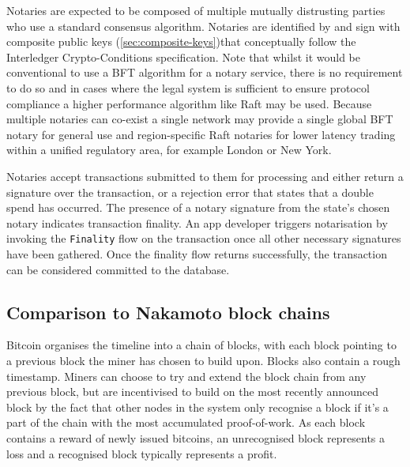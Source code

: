 \documentclass{article}
\begin{document}
Notaries are expected to be composed of multiple mutually distrusting parties who use a standard consensus algorithm.
Notaries are identified by and sign with composite public keys (\cref{sec:composite-keys})that conceptually follow the
Interledger Crypto-Conditions specification\cite{ILPCC}. Note that whilst it would be conventional to use a BFT
algorithm for a notary service, there is no requirement to do so and in cases where the legal system is sufficient to
ensure protocol compliance a higher performance algorithm like Raft\cite{Ongaro:2014:SUC:2643634.2643666} may be used.
Because multiple notaries can co-exist a single network may provide a single global BFT notary for general use and
region-specific Raft notaries for lower latency trading within a unified regulatory area, for example London or New York.

Notaries accept transactions submitted to them for processing and either return a signature over the transaction, or
a rejection error that states that a double spend has occurred. The presence of a notary signature from the state's
chosen notary indicates transaction finality. An app developer triggers notarisation by invoking the
\texttt{Finality} flow on the transaction once all other necessary signatures have been gathered. Once the finality flow
returns successfully, the transaction can be considered committed to the database.

\subsection{Comparison to Nakamoto block chains}

Bitcoin organises the timeline into a chain of blocks, with each block pointing to a previous block the miner has chosen
to build upon. Blocks also contain a rough timestamp. Miners can choose to try and extend the block chain from any
previous block, but are incentivised to build on the most recently announced block by the fact that other nodes in the
system only recognise a block if it's a part of the chain with the most accumulated proof-of-work. As each block contains
a reward of newly issued bitcoins, an unrecognised block represents a loss and a recognised block typically represents
a profit.
\end{document}
